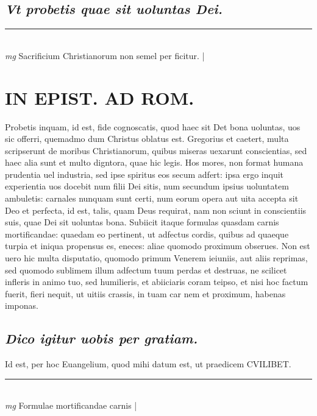 \documentclass{article}
\begin{document}
\begin{pages}
\subsection*{\textit{Vt probetis quae sit uoluntas Dei. }}
\vspace{0.5cm}\noindent
\vspace{0.2cm}\rule{1cm}{0.2pt}\\ 
\hspace{0.2cm}\textit{mg}
\footnotesize Sacrificium Christianorum non semel per ficitur. 
\normalsize| 
\section*{IN EPIST. AD ROM.  }
\marginpar{[ p.142 ]}\pstart Probetis inquam, id est, fide cognoscatis, quod haec sit Det bona uoluntas, uos sic offerri, quemadmo dum Christus oblatus est. Gregorius et caetert, multa scripserunt de moribus Christianorum, quibus miseras uexarunt conscientias, sed haec alia sunt et multo digntora, quae hic legis. Hos mores, non format humana prudentia uel industria, sed ipse spiritus eos secum adfert: ipsa ergo inquit experientia uos docebit num filii Dei sitis, num secundum ipsius uoluntatem ambuletis: carnales nunquam sunt certi, num eorum opera aut uita accepta sit Deo et perfecta, id est, talis, quam Deus requirat, nam non sciunt in conscientiis suis, quae Dei sit uoluntas bona. Subiicit itaque formulas quasdam carnis mortificandae: quaedam eo pertinent, ut adfectus cordis, quibus ad quaeque turpia et iniqua propensus es, eneces: aliae quomodo proximum obserues. Non est uero hic multa disputatio, quomodo primum Venerem ieiuniis, aut aliis reprimas, sed quomodo sublimem illum adfectum tuum perdas et destruas, ne scilicet infleris in animo tuo, sed humilieris, et abiiciaris coram teipso, et nisi hoc factum fuerit, fieri nequit, ut uitiis crassis, in tuam car nem et proximum, habenas imponas.  \pend
{}
{}
\subsection*{\textit{Dico igitur uobis per gratiam. }}\pstart Id est, per hoc Euangelium, quod mihi datum est, ut praedicem CVILIBET.  \pend
\vspace{0.5cm}\noindent
\vspace{0.2cm}\rule{1cm}{0.2pt}\\ 
\hspace{0.2cm}\textit{mg}
\footnotesize Formulae mortificandae carnis 
\normalsize| 

\end{pages}
\end{document}
